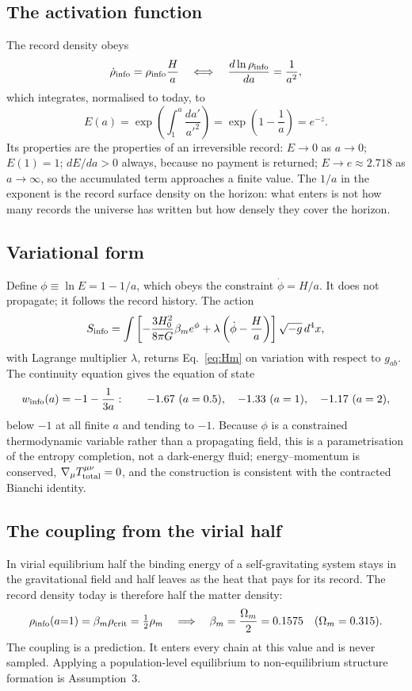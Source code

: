 \subsection{The activation function}
The record density obeys
\begin{equation}
\dot\rho_{\rm info}=\rho_{\rm info}\frac{H}{a}\quad\Longleftrightarrow\quad\frac{d\ln\rho_{\rm info}}{da}=\frac{1}{a^2},
\end{equation}
which integrates, normalised to today, to
\begin{equation}
E(a)=\exp\!\left(\int_1^a\frac{da'}{a'^2}\right)=\exp\!\left(1-\frac1a\right)=e^{-z}. \label{eq:Ea}
\end{equation}
Its properties are the properties of an irreversible record: $E\to0$ as $a\to0$; $E(1)=1$; $dE/da>0$ always, because no payment is returned;
$E\to e\approx2.718$ as $a\to\infty$, so the accumulated term approaches a finite value. The $1/a$ in the exponent is the record surface density on the
horizon: what enters is not how many records the universe has written but how densely they cover the horizon.

\subsection{Variational form}
Define $\phi\equiv\ln E=1-1/a$, which obeys the constraint $\dot\phi=H/a$. It does not propagate; it follows the record history. The action
\begin{equation}
S_{\rm info}=\int\left[-\frac{3H_0^2}{8\pi G}\beta_me^{\phi}+\lambda\left(\dot\phi-\frac{H}{a}\right)\right]\sqrt{-g}\,d^4x,
\end{equation}
with Lagrange multiplier $\lambda$, returns Eq.~\eqref{eq:Hm} on variation with respect to $g_{ab}$. The continuity equation gives the equation of state
\begin{equation}
w_{\rm info}(a)=-1-\frac{1}{3a}:\qquad -1.67\ (a=0.5),\quad -1.33\ (a=1),\quad -1.17\ (a=2),
\end{equation}
below $-1$ at all finite $a$ and tending to $-1$. Because $\phi$ is a constrained thermodynamic variable rather than a propagating field, this is a
parametrisation of the entropy completion, not a dark-energy fluid; energy--momentum is conserved, $\nabla_\mu T^{\mu\nu}_{\rm total}=0$, and the
construction is consistent with the contracted Bianchi identity.

\subsection{The coupling from the virial half}
In virial equilibrium half the binding energy of a self-gravitating system stays in the gravitational field and half leaves as the heat that pays for its
record. The record density today is therefore half the matter density:
\begin{equation}
\rho_{\rm info}(a{=}1)=\beta_m\rho_{\rm crit}=\tfrac12\rho_m\quad\Longrightarrow\quad\beta_m=\frac{\Omega_m}{2}=0.1575\quad(\Omega_m=0.315).
\end{equation}
The coupling is a prediction. It enters every chain at this value and is never sampled. Applying a population-level equilibrium to non-equilibrium
structure formation is Assumption~3.


